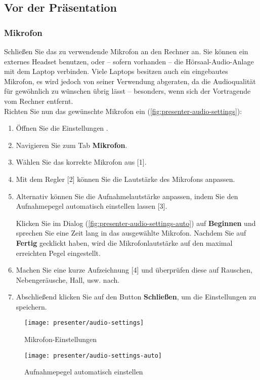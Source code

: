\subsection*{Vor der Präsentation}

\subsubsection{Mikrofon}
Schließen Sie das zu verwendende Mikrofon an den Rechner an. Sie können ein externes Headset benutzen, oder -- sofern vorhanden -- die Hörsaal-Audio-Anlage mit dem Laptop verbinden.
Viele Laptops besitzen auch ein eingebautes Mikrofon, es wird jedoch von seiner Verwendung abgeraten, da die Audioqualität für gewöhnlich zu wünschen übrig lässt -- besonders, wenn sich der Vortragende vom Rechner entfernt.
\\
Richten Sie nun das gewünschte Mikrofon ein (\autoref{fig:presenter-audio-settings}):
\begin{enumerate}
	\item Öffnen Sie die Einstellungen .
	\item Navigieren Sie zum Tab \textbf{Mikrofon}.
	\item Wählen Sie das korrekte Mikrofon aus [1].
	\item Mit dem Regler [2] können Sie die Lautstärke des Mikrofons anpassen.
	\item Alternativ können Sie die Aufnahmelautstärke anpassen, indem Sie den Aufnahmepegel automatisch einstellen lassen [3].
	
	Klicken Sie im Dialog (\autoref{fig:presenter-audio-settings-auto}) auf \textbf{Beginnen} und sprechen Sie eine Zeit lang in das ausgewählte Mikrofon. Nachdem Sie auf \textbf{Fertig} gecklickt haben, wird die Mikrofonlautstärke auf den maximal erreichten Pegel eingestellt.

	\item Machen Sie eine kurze Aufzeichnung [4] und überprüfen diese auf Rauschen, Nebengeräusche, Hall, usw. nach.
	\item Abschließend klicken Sie auf den Button \textbf{Schließen}, um die Einstellungen zu speichern.
\end{enumerate}

\begin{figure}[H]
	\texttt{[image: presenter/audio-settings]}
	\caption{Mikrofon-Einstellungen}
	\label{fig:presenter-audio-settings}
\end{figure}
\begin{figure}[H]
	\texttt{[image: presenter/audio-settings-auto]}
	\caption{Aufnahmepegel automatisch einstellen}
	\label{fig:presenter-audio-settings-auto}
\end{figure}

